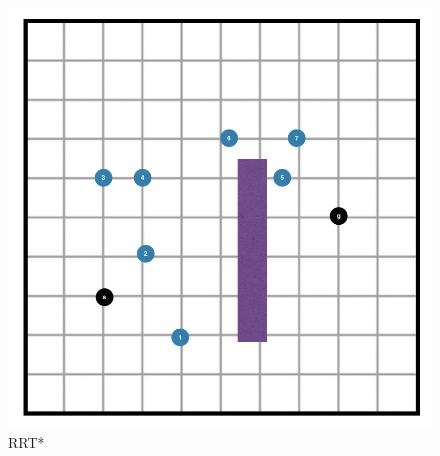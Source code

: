 \documentclass[11pt]{article}
\begin{document}
    \begin{figure}[ht]
    \centering
    \includegraphics[scale=0.5]{figures/finalfinalrrtproblem}
    \caption{RRT*}
    \end{figure}
\fi


\clearpage
\end{document}
